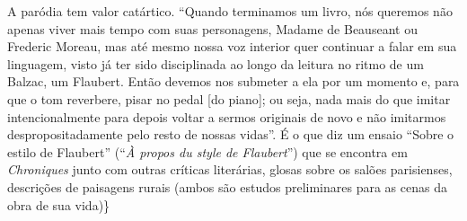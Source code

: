 A paródia tem valor catártico. ``Quando terminamos um livro, nós queremos
não apenas viver mais tempo com suas personagens, Madame de Beauseant ou
Frederic Moreau, mas até mesmo nossa voz interior quer continuar a falar
em sua linguagem, visto já ter sido disciplinada ao longo da leitura no
ritmo de um Balzac, um Flaubert. Então devemos nos submeter a ela por um
momento e, para que o tom reverbere, pisar no pedal {[}do piano{]}; ou
seja, nada mais do que imitar intencionalmente para depois voltar a
sermos originais de novo e não imitarmos despropositadamente pelo resto
de nossas vidas''. É o que diz um ensaio ``Sobre o estilo de Flaubert''
(``\emph{À propos du style de Flaubert}'') que se encontra em
\emph{Chroniques} junto com outras críticas literárias, glosas sobre os
salões parisienses, descrições de paisagens rurais (ambos são estudos
preliminares para as cenas da obra de sua vida)\}

